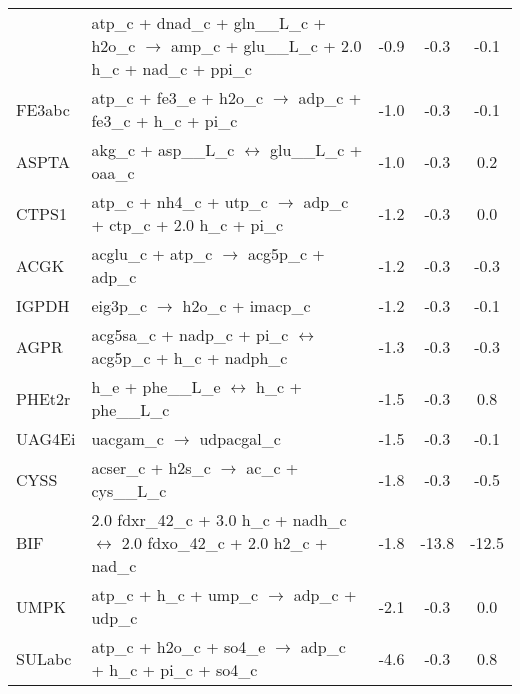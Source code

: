 \begin{longtable}{lp{}ccc}
{NADS2	&	atp\_c + dnad\_c + gln\_\_L\_c + h2o\_c $\rightarrow$ amp\_c + glu\_\_L\_c + 2.0 h\_c + nad\_c + ppi\_c	&	-0.9	&	-0.3	&	-0.1	\\
FE3abc	&	atp\_c + fe3\_e + h2o\_c $\rightarrow$ adp\_c + fe3\_c + h\_c + pi\_c	&	-1.0	&	-0.3	&	-0.1	\\
ASPTA	&	akg\_c + asp\_\_L\_c $\leftrightarrow$ glu\_\_L\_c + oaa\_c	&	-1.0	&	-0.3	&	0.2	\\
CTPS1	&	atp\_c + nh4\_c + utp\_c $\rightarrow$ adp\_c + ctp\_c + 2.0 h\_c + pi\_c	&	-1.2	&	-0.3	&	0.0	\\
ACGK	&	acglu\_c + atp\_c $\rightarrow$ acg5p\_c + adp\_c	&	-1.2	&	-0.3	&	-0.3	\\
IGPDH	&	eig3p\_c $\rightarrow$ h2o\_c + imacp\_c	&	-1.2	&	-0.3	&	-0.1	\\
AGPR	&	acg5sa\_c + nadp\_c + pi\_c $\leftrightarrow$ acg5p\_c + h\_c + nadph\_c	&	-1.3	&	-0.3	&	-0.3	\\
PHEt2r	&	h\_e + phe\_\_L\_e $\leftrightarrow$ h\_c + phe\_\_L\_c	&	-1.5	&	-0.3	&	0.8	\\
UAG4Ei	&	uacgam\_c $\rightarrow$ udpacgal\_c	&	-1.5	&	-0.3	&	-0.1	\\
CYSS	&	acser\_c + h2s\_c $\rightarrow$ ac\_c + cys\_\_L\_c	&	-1.8	&	-0.3	&	-0.5	\\
BIF	&	2.0 fdxr\_42\_c + 3.0 h\_c + nadh\_c $\leftrightarrow$ 2.0 fdxo\_42\_c + 2.0 h2\_c + nad\_c	&	-1.8	&	-13.8	&	-12.5	\\
UMPK	&	atp\_c + h\_c + ump\_c $\rightarrow$ adp\_c + udp\_c	&	-2.1	&	-0.3	&	0.0	\\
SULabc	&	atp\_c + h2o\_c + so4\_e $\rightarrow$ adp\_c + h\_c + pi\_c + so4\_c	&	-4.6	&	-0.3	&	0.8	\\
\end{longtable}
\normalsize

